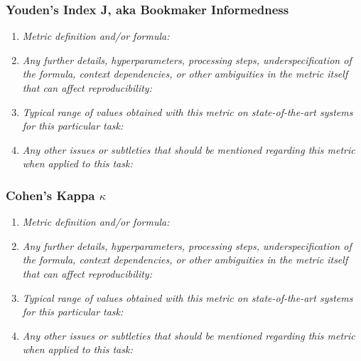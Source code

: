 \documentclass[a4paper,11pt]{article}
\begin{document}
        \subsubsection{Youden's Index J, aka Bookmaker Informedness}
            \begin{enumerate}[label=\alph*.]
                \item \textit{Metric definition and/or formula:}
                \bigskip
                \item \textit{Any further details, hyperparameters, processing steps, underspecification of the formula, context dependencies, or other ambiguities in the metric itself that can affect reproducibility:}
                \bigskip
                \item \textit{Typical range of values obtained with this metric on state-of-the-art systems for this particular task:}
                \bigskip
                \item \textit{Any other issues or subtleties that should be mentioned regarding this metric when applied to this task:}
                \bigskip
            \end{enumerate}
        \subsubsection{Cohen's Kappa $\kappa$}
            \begin{enumerate}[label=\alph*.]
                \item \textit{Metric definition and/or formula:}
                \bigskip
                \item \textit{Any further details, hyperparameters, processing steps, underspecification of the formula, context dependencies, or other ambiguities in the metric itself that can affect reproducibility:}
                \bigskip
                \item \textit{Typical range of values obtained with this metric on state-of-the-art systems for this particular task:}
                \bigskip
                \item \textit{Any other issues or subtleties that should be mentioned regarding this metric when applied to this task:}
                \bigskip
            \end{enumerate}
\end{document}
